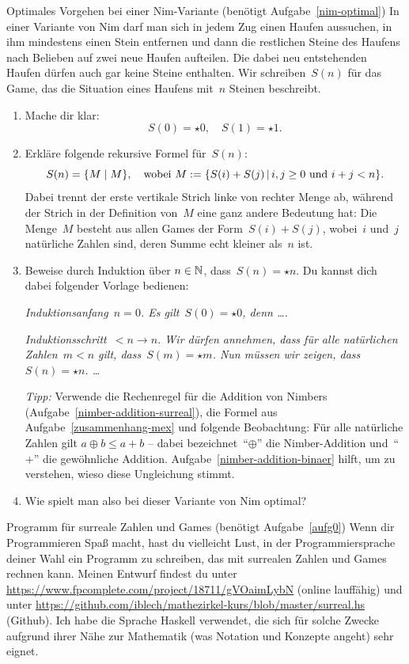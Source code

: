\documentclass{zirkelblatt}
\begin{document}
\begin{aufgabe}{Optimales Vorgehen bei einer Nim-Variante
(benötigt Aufgabe~\ref{nim-optimal})}
In einer Variante von Nim darf man sich in jedem Zug einen Haufen aussuchen, in
ihm mindestens einen Stein entfernen und dann die restlichen Steine des Haufens
nach Belieben auf zwei neue Haufen aufteilen. Die dabei neu entstehenden Haufen
dürfen auch gar keine Steine enthalten. Wir schreiben~$S(n)$ für das Game, das
die Situation eines Haufens mit~$n$ Steinen beschreibt.
\begin{enumerate}
\item Mache dir klar:
\[ S(0) = \star0, \quad S(1) = \star1. \]
\item Erkläre folgende rekursive Formel für~$S(n)$:
\[ S(n) = \{ M \mathrel{|} M \}, \quad \text{wobei $M := \{ S(i) + S(j) \,|\, \text{$i,j
\geq 0$ und $i+j < n$} \}$}. \]
Dabei trennt der erste vertikale Strich linke von rechter Menge ab, während
der Strich in der Definition von~$M$ eine ganz andere Bedeutung hat: Die
Menge~$M$ besteht aus allen Games der Form~$S(i) + S(j)$, wobei~$i$ und~$j$
natürliche Zahlen sind, deren Summe echt kleiner als~$n$ ist.
\item Beweise durch Induktion über $n \in \mathbb{N}$, dass~$S(n) = \star n$. Du
kannst dich dabei folgender Vorlage bedienen:

\emph{Induktionsanfang~$n = 0$. Es gilt~$S(0) = \star 0$, denn \ldots.}

\emph{Induktionsschritt~$< n \to n$. Wir dürfen annehmen, dass für alle
natürlichen Zahlen~$m < n$ gilt, dass~$S(m) = \star m$. Nun müssen wir zeigen,
dass~$S(n) = \star n$. \ldots}

\emph{Tipp:} Verwende die Rechenregel für die Addition von Nimbers
(Aufgabe~\ref{nimber-addition-surreal}), die Formel aus
Aufgabe~\ref{zusammenhang-mex} und folgende Beobachtung: Für alle natürliche
Zahlen gilt $a \oplus b \leq a + b$ -- dabei bezeichnet~"`$\oplus$"' die
Nimber-Addition und~"`$+$"' die gewöhnliche Addition.
Aufgabe~\ref{nimber-addition-binaer} hilft, um zu verstehen, wieso diese
Ungleichung stimmt.
\item Wie spielt man also bei dieser Variante von Nim optimal?
\end{enumerate}
\end{aufgabe}

\begin{aufgabe}{Programm für surreale Zahlen und Games
(benötigt Aufgabe~\ref{aufg0})}
Wenn dir Programmieren Spaß macht, hast du vielleicht Lust, in der
Programmiersprache deiner Wahl ein Programm zu schreiben, das mit surrealen
Zahlen und Games rechnen kann. Meinen Entwurf findest du unter
\url{https://www.fpcomplete.com/project/18711/gVOaimLybN} (online lauffähig)
und unter
\url{https://github.com/iblech/mathezirkel-kurs/blob/master/surreal.hs}
(Github). Ich habe die Sprache Haskell verwendet, die sich für solche Zwecke
aufgrund ihrer Nähe zur Mathematik (was Notation und Konzepte angeht) sehr
eignet.
\end{aufgabe}


\loesungenfalse
\end{document}
